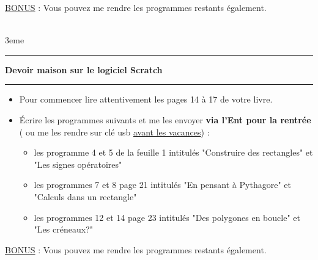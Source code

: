 \documentclass[a4paper,11pt]{article}
\newcommand{\bi}{\begin{itemize}}
\newcommand{\ei}{\end{itemize}}
\newcommand{\titre}[5] 
{
\noindent #2 \hfill #4 \\
#3 \hfill #5

\vspace{-1.6cm}

\begin{center}\rule{6cm}{0.5mm}\end{center}
\vspace{0.2cm}
\begin{center}{\large{\textbf{#1}}}\end{center}
\begin{center}\rule{6cm}{0.5mm}\end{center}
}
\begin{document}
\underline{BONUS} : Vous pouvez me rendre les programmes restants également.

\vspace*{3cm}

\titre{Devoir maison sur le logiciel Scratch}{}{}{}{3eme}


\bi

\item Pour commencer lire attentivement les pages 14 à 17 de votre livre.\\

\item Écrire les programmes suivants et me les envoyer \textbf{via l'Ent pour la rentrée} ( ou me les rendre sur clé usb \underline{avant les vacances}) :\\

\begin{itemize}[label=\textbullet]
\item les programme 4 et 5 de la feuille 1 intitulés "Construire des rectangles" et "Les signes opératoires"

\item les programmes 7 et 8 page 21 intitulés "En pensant à Pythagore" et "Calculs dans un rectangle"

\item les programmes 12 et 14 page 23 intitulés "Des polygones en boucle" et "Les créneaux?"\\

\end{itemize}
\ei

\underline{BONUS} : Vous pouvez me rendre les programmes restants également.
\end{document}
